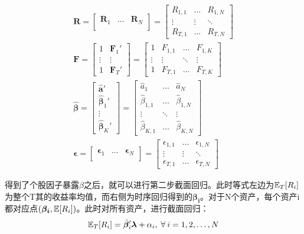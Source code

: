 \documentclass[11pt]{article}
\begin{document}
\begin{gather*}
    \bm{R} = \begin{bmatrix} \bm{R}_1 & \dots & \bm{R}_N \\ \end{bmatrix}
    = \begin{bmatrix} R_{1,1} & \dots & R_{1,N} \\ \vdots & \vdots & \ddots \\ R_{T,1} & \dots & R_{T,N} \end{bmatrix} \\
    \bm{F} = \begin{bmatrix} 1 & \bm{F}_{1}' \\ \vdots & \vdots \\ 1 & \bm{F}_{T}' \end{bmatrix}
    = \begin{bmatrix} 1 & F_{1,1} & \dots & F_{1,K} \\ \vdots & \vdots & \ddots & \vdots \\ 1 & F_{T,1} & \dots & F_{T,K} \end{bmatrix} 
    \\
    \hat{\bm{\beta}}
    = \begin{bmatrix} \hat{\bm{a}}' \\ \hat{\bm{\beta}}_{1}' \\ \vdots \\ \hat{\bm{\beta}}_{K}' \end{bmatrix}
    = \begin{bmatrix} \hat{a}_{1} & \dots & \hat{a}_{N} \\ \hat{\beta}_{1,1} & \dots & \hat{\beta}_{1,N} \\ \vdots & \ddots & \vdots \\ \hat{\beta}_{K,1} & \dots & \hat{\beta}_{K,N} \end{bmatrix}
    \\
    \bm{\epsilon} = \begin{bmatrix}
        \bm{\epsilon}_1 & \dots & \bm{\epsilon}_N \\
    \end{bmatrix}
    = \begin{bmatrix} \epsilon_{1,1} & \dots & \epsilon_{1,N} \\ \vdots & \vdots & \ddots \\ \epsilon_{T,1} & \dots & \epsilon_{T,N} \end{bmatrix}
\end{gather*}

得到了个股因子暴露$\beta$之后，就可以进行第二步截面回归。此时等式左边为$\mathbb{E}_T[R_i]$为整个T其的收益率均值，而右侧为时序回归得到的$\bm{\beta_i}$。对于N个资产，每个资产i都对应点$(\bm{\beta_i},\mathbb{E}[R_i])$。此时对所有资产，进行截面回归：
\begin{equation*}
    \E_T[R_i] = \hat{\bm{\beta}}_{i}' \bm{\lambda} + \alpha_i \ilsep \forall i=1,2,\dots,N
\end{equation*}
\end{document}
